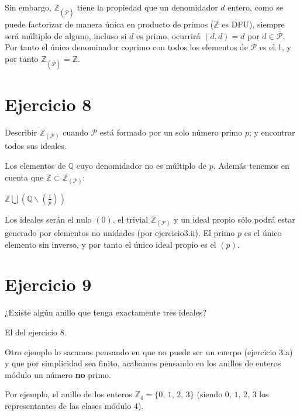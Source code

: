 \documentclass[10pt,a4paper]{article}
\begin{document}
	
	\hfill
	
	Sin embargo, $\mathbb{Z}_{\left( \overline{\mathcal{P}} \right)} $ tiene la propiedad que un denomidador $d$ entero, como se puede factorizar de manera única en producto de primos ($\mathbb{Z}$ es DFU), siempre será múltiplo de alguno, incluso si $d$ es primo, ocurrirá $(d,d)=d$ por $d\in \overline{\mathcal{P}}$. Por tanto el único denominador coprimo con todos los elementos de $\overline{\mathcal{P}}$ es el 1, y por tanto $\mathbb{Z}_{\left( \overline{\mathcal{P}} \right)} = \mathbb{Z}$.
	
	
	\section*{Ejercicio 8}
	
	Describir $\mathbb{Z}_{\left( \mathcal{P} \right)} $ cuando $\mathcal{P}$ está formado por un solo número primo $p$; y encontrar todos sus ideales.
	
	\hfill
	
	
	Los elementos de $\mathbb{Q}$ cuyo denomidador no es múltiplo de $p$. Además tenemos en cuenta que $\mathbb{Z} \subset \mathbb{Z}_{(\mathcal{P})}$:
	
	$ \mathbb{Z} \bigcup \left( \mathbb{Q} \smallsetminus \left( \frac{1}{p} \right) \right) $ 
	
	
	\hfill
	
	Los ideales serán el nulo $(0)$, el trivial $\mathbb{Z}_{\left( \mathcal{P} \right)} $ y un ideal propio sólo podrá estar generado por elementos no unidades (por ejercicio3.ii). El primo $p$ es el único elemento sin inverso, y por tanto el único ideal propio es el $(p)$.
	
	
	\section*{Ejercicio 9}
	
	¿Existe algún anillo que tenga exactamente tres ideales?
	
	
	\hfill
	
	El del ejercicio 8.
	
	\hfill
	
	
	Otro ejemplo lo sacamos pensando en que no puede ser un cuerpo (ejercicio 3.a) y que por simplicidad sea finito, acabamos pensando en los anillos de enteros módulo un número \textbf{no} primo.
	
	Por ejemplo, el anillo de los enteros $\mathbb{Z}_4 = \{0,\, 1,\, 2,\, 3\}$ (siendo $0,\, 1,\, 2,\, 3$ los representantes de las clases módulo 4).
	
\end{document}
